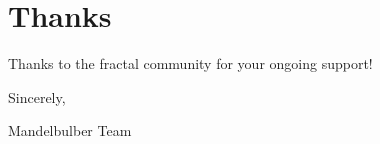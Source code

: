 \section{Thanks}

Thanks to the fractal community for your ongoing support! 

Sincerely,

Mandelbulber Team

